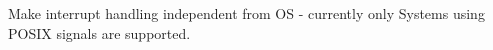 
\begin{DoxyRefList}
\item[Member \mbox{\hyperlink{main_8cpp_a6165098e568a4d12627b33ad880d0961}{interrupt\+Handler}} (\mbox{[}\mbox{[}maybe\+\_\+unused\mbox{]}\mbox{]} int s)]\label{todo__todo000001}%
%
Make interrupt handling independent from OS -\/ currently only Systems using POSIX signals are supported. 
\end{DoxyRefList}